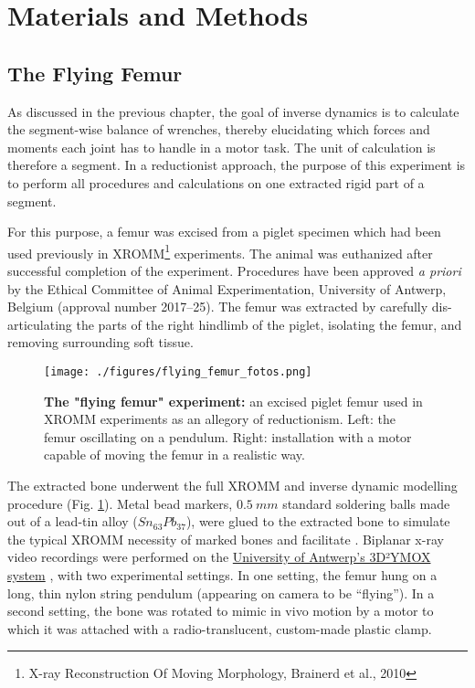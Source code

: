 \FloatBarrier\clearpage
\section{Materials and Methods}
\label{sec:org2d0b853}
\subsection{The Flying Femur}
\label{sec:org6d460e9}

As discussed in the previous chapter, the goal of inverse dynamics is to calculate the segment-wise balance of wrenches, thereby elucidating which forces and moments each joint has to handle in a motor task.
The unit of calculation is therefore a segment.
In a reductionist approach, the purpose of this experiment is to perform all procedures and calculations on one extracted rigid part of a segment.

For this purpose, a femur was excised from a piglet specimen which had been used previously in XROMM\footnote{X-ray Reconstruction Of Moving Morphology, Brainerd et al., 2010} experiments. \nocite{Brainerd2010}
The animal was euthanized after successful completion of the experiment.
Procedures have been approved \emph{a priori} by the Ethical Committee of Animal Experimentation, University of Antwerp, Belgium (approval number 2017–25).
The femur was extracted by carefully dis-articulating the parts of the right hindlimb of the piglet, isolating the femur, and removing surrounding soft tissue.

\begin{figure}[p]
\centering
\texttt{[image: ./figures/flying\_femur\_fotos.png]}
\caption{\label{fig:flying_femur_fotos}\textbf{The "flying femur" experiment:} an excised piglet femur used in XROMM experiments as an allegory of reductionism. Left: the femur oscillating on a pendulum. Right: installation with a motor capable of moving the femur in a realistic way.}
\end{figure}


The extracted bone underwent the full XROMM and inverse dynamic modelling procedure (Fig. \ref{fig:flying_femur_fotos}).
Metal bead markers, \(0.5\ mm\) standard soldering balls made out of a lead-tin alloy (\(Sn_{63}Pb_{37}\)), were glued to the extracted bone to simulate the typical XROMM necessity of marked bones and facilitate .
Biplanar x-ray video recordings were performed on the \href{https://www.uantwerpen.be/3d2ymox}{University of Antwerp's 3D²YMOX system} \citep{Nguyen2021,Sanctorum2020}, with two experimental settings.
In one setting, the femur hung on a long, thin nylon string pendulum (appearing on camera to be ``flying'').
In a second setting, the bone was rotated to mimic in vivo motion by a motor to which it was attached with a radio-translucent, custom-made plastic clamp.

